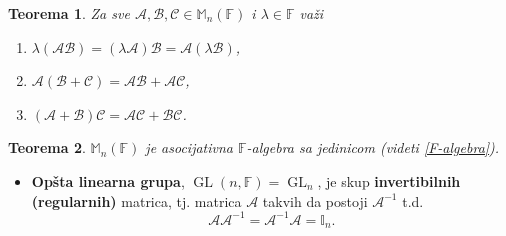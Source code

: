 \documentclass[a4paper,12pt,twoside]{report}
\newtheorem{theorem}{Teorema}[section]
\numberwithin{algorithm}{section}
\begin{document}
\begin{theorem}
    Za sve $\mathcal{A, B, C} \in \mathbb{M}_n(\mathbb{F})$ i $\lambda \in \mathbb{F}$ važi
    \begin{enumerate}
        \item $\lambda(\mathcal{AB}) = (\lambda \mathcal{A})\mathcal{B} = \mathcal{A}(\lambda \mathcal{B})$,
        \item $\mathcal{A(B + C) = AB + AC}$,
        \item $\mathcal{(A + B)C = AC + BC}$.
    \end{enumerate}
\end{theorem}

\begin{theorem}
    $\mathbb{M}_n(\mathbb{F})$ je asocijativna $\mathbb{F}$-algebra sa jedinicom (videti \ref{F-algebra}).
\end{theorem}

\begin{itemize}
    \item \textbf{Opšta linearna grupa}, $\operatorname{GL}(n, \mathbb{F}) = \operatorname{GL}_n$, je skup \textbf{invertibilnih (regularnih)} matrica, tj. matrica $\mathcal{A}$ takvih da 
    postoji $\mathcal{A}^{-1}$ t.d.
    \[ \mathcal{AA}^{-1} = \mathcal{A}^{-1}\mathcal{A} = \mathbb{I}_n. \]
\end{itemize}
\newpage
\end{document}

